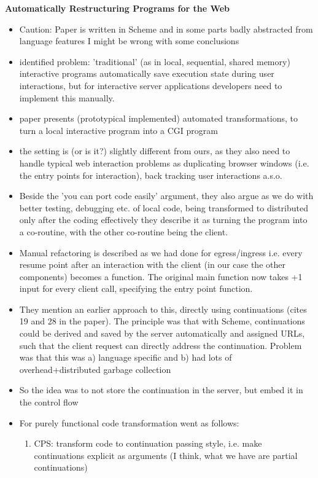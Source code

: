 \textbf{Automatically Restructuring Programs for the Web}~\cite{graunke2001automatically}
\begin{itemize}
    \item Caution: Paper is written in Scheme and in some parts badly abstracted from language features \means I might be wrong with some conclusions
    \item identified problem: 'traditional' (as in local, sequential, shared memory) interactive programs automatically save execution state during user interactions, but for interactive server applications developers need to implement this manually.
    \item paper presents (prototypical implemented) automated transformations, to turn a local interactive program into a CGI program
    \item the setting is (or is it?) slightly different from ours, as they also need to handle typical web interaction problems as duplicating browser windows (i.e. the entry points for interaction), back tracking user interactions a.s.o.
    \item Beside the 'you can port code easily' argument, they also argue as we do with better testing, debugging etc. of local code, being transformed to distributed only after the coding \means effectively they describe it as turning the program into a co-routine, with the other co-routine being the client. 
    \item Manual refactoring is described as we had done for egress/ingress i.e. every resume point after an interaction with the client (in our case the other components) becomes a function. The original main function now takes +1 input for every client call, specifying the entry point function.
    \item They mention an earlier approach to this, directly using continuations (cites 19 and 28 in the paper). The principle was that with Scheme, continuations could be derived and saved by the server automatically and assigned URLs, such that the client request can directly address the continuation. Problem was that this was a) language specific and b) had lots of overhead+distributed garbage collection 
    \item So the idea was to not store the continuation in the server, but embed it in the control flow
    \item For purely functional code transformation went as follows:
    \begin{enumerate}
        \item CPS: transform code to continuation passing style, i.e. make continuations explicit as arguments (I think, what we have are partial continuations)

\end{enumerate}
\end{itemize}
